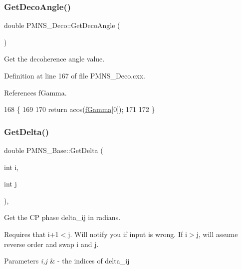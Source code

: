 \subsubsection{\texorpdfstring{Get\+Deco\+Angle()}{GetDecoAngle()}}
{\footnotesize\ttfamily double P\+M\+N\+S\+\_\+\+Deco\+::\+Get\+Deco\+Angle (\begin{DoxyParamCaption}{ }\end{DoxyParamCaption})\hspace{0.3cm}{\ttfamily [virtual]}}

Get the decoherence angle value. 

Definition at line 167 of file P\+M\+N\+S\+\_\+\+Deco.\+cxx.



References f\+Gamma.


\begin{DoxyCode}
168 \{
169 
170   \textcolor{keywordflow}{return} acos(\hyperlink{classOscProb_1_1PMNS__Deco_ae2f30ac9f8b25344959f1698616d337a}{fGamma}[0]);
171   
172 \}
\end{DoxyCode}
\mbox{\label{classOscProb_1_1PMNS__Base_adb8dbc91d4286d2e7c8f768c59476241}} 
\subsubsection{\texorpdfstring{Get\+Delta()}{GetDelta()}}
{\footnotesize\ttfamily double P\+M\+N\+S\+\_\+\+Base\+::\+Get\+Delta (\begin{DoxyParamCaption}\item[{int}]{i,  }\item[{int}]{j }\end{DoxyParamCaption})\hspace{0.3cm}{\ttfamily [virtual]}, {\ttfamily [inherited]}}

Get the CP phase delta\+\_\+ij in radians.

Requires that i+1$<$j. Will notify you if input is wrong. If i$>$j, will assume reverse order and swap i and j.


\begin{DoxyParams}{Parameters}
{\em i,j} & -\/ the indices of delta\+\_\+ij \\
\hline
\end{DoxyParams}


